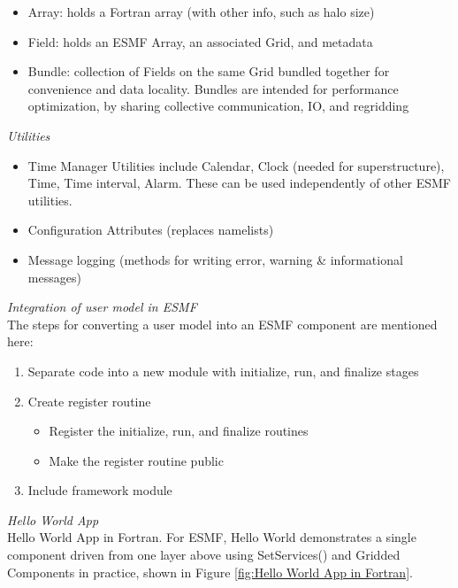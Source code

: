 \begin{itemize}
	\item Array: holds a Fortran array (with other info, such as halo size)
	\item Field: holds an ESMF Array, an associated Grid, and metadata
	\item Bundle: collection of Fields on the same Grid bundled together for convenience and data locality. Bundles are intended for performance optimization, by sharing collective communication, IO, and regridding
\end{itemize}

\emph{Utilities}\\
\begin{itemize}
	\item Time Manager Utilities include Calendar, Clock (needed for superstructure), Time, Time interval, Alarm. These can be used independently of other ESMF utilities.
	\item Configuration Attributes (replaces namelists)
	\item Message logging (methods for writing error, warning \& informational messages)
\end{itemize}

\emph{Integration of user model in ESMF}\\
The steps for converting a user model into an ESMF component are mentioned here:\\
\begin{enumerate}
\item Separate code into a new module with initialize, run, and finalize stages
\item Create register routine
\begin{itemize}
	\item Register the initialize, run, and finalize routines
	\item Make the register routine public
\end{itemize}
\item Include framework module
\end{enumerate}

\emph{Hello World App}\\
Hello World App in Fortran. For ESMF, Hello World demonstrates a single component driven from one layer above using SetServices() and Gridded Components in practice, shown in Figure \ref{fig:Hello World App in Fortran}.

